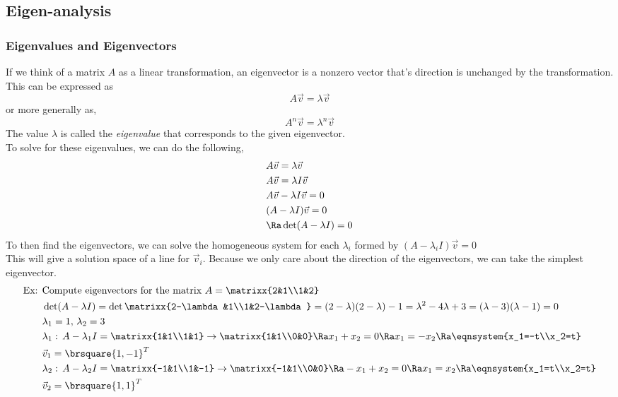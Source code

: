 \subsection{Eigen-analysis}

\subsubsection{Eigenvalues and Eigenvectors}
If we think of a matrix $A$ as a linear transformation, an eigenvector is a nonzero vector that's direction is unchanged by the transformation. This can be expressed as
$$A\vec{v}=\lambda\vec{v}$$
or more generally as,
$$A^n\vec{v}=\lambda^n\vec{v}$$
The value $\lambda$ is called the \textit{eigenvalue} that corresponds to the given eigenvector.\\
To solve for these eigenvalues, we can do the following,
\begin{align*}
    &A\vec{v}=\lambda\vec{v}\\
    &A\vec{v}=\lambda I\vec{v}\\
    &A\vec{v}-\lambda I\vec{v}=0\\
    &(A-\lambda I)\vec{v}=0\\
    &\Ra \det(A-\lambda I)=0
\end{align*}
To then find the eigenvectors, we can solve the homogeneous system for each $\lambda_i$ formed by $(A-\lambda_i I)\vec{v}=0$\\
This will give a solution space of a line for $\vec{v}_i$. Because we only care about the direction of the eigenvectors, we can take the simplest eigenvector.
\begin{align*}
    \text{Ex: }&\text{Compute eigenvectors for the matrix }A=\matrixx{2&1\\1&2}\\
    &\det(A-\lambda I)=\det\matrixx{2-\lambda&1\\1&2-\lambda}=(2-\lambda)(2-\lambda)-1=\lambda^2-4\lambda+3=(\lambda-3)(\lambda-1)=0\\
    &\lambda_1=1,\,\lambda_2=3\\
    &\lambda_1:\,A-\lambda_1I=\matrixx{1&1\\1&1}\to\matrixx{1&1\\0&0}\Ra x_1+x_2=0\Ra x_1=-x_2\Ra \eqnsystem{x_1=-t\\x_2=t}\\
    &\vec{v}_1=\brsquare{1,-1}^T\\
    &\lambda_2:\,A-\lambda_2 I=\matrixx{-1&1\\1&-1}\to\matrixx{-1&1\\0&0}\Ra -x_1+x_2=0\Ra x_1=x_2\Ra \eqnsystem{x_1=t\\x_2=t}\\
    &\vec{v}_2=\brsquare{1,1}^T
\end{align*}
